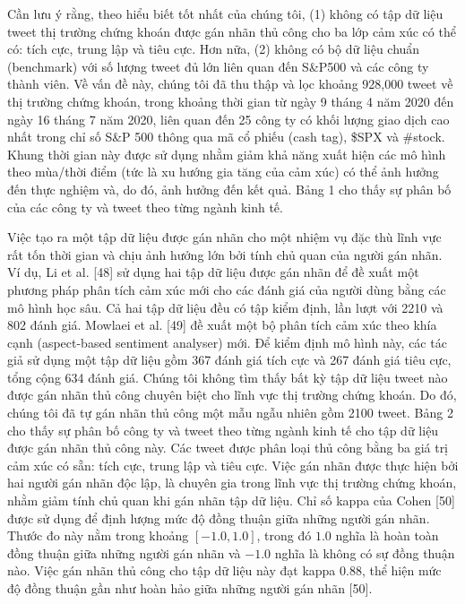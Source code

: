 Cần lưu ý rằng, theo hiểu biết tốt nhất của chúng tôi, (1) không có tập dữ liệu tweet thị trường chứng khoán được gán nhãn thủ công cho ba lớp cảm xúc có thể có: tích cực, trung lập và tiêu cực. Hơn nữa, (2) không có bộ dữ liệu chuẩn (benchmark) với số lượng tweet đủ lớn liên quan đến S\&P500 và các công ty thành viên. Về vấn đề này, chúng tôi đã thu thập và lọc khoảng 928,000 tweet về thị trường chứng khoán, trong khoảng thời gian từ ngày 9 tháng 4 năm 2020 đến ngày 16 tháng 7 năm 2020, liên quan đến 25 công ty có khối lượng giao dịch cao nhất trong chỉ số S\&P 500 thông qua mã cổ phiếu (cash tag), \$SPX và \#stock. Khung thời gian này được sử dụng nhằm giảm khả năng xuất hiện các mô hình theo mùa/thời điểm (tức là xu hướng gia tăng của cảm xúc) có thể ảnh hưởng đến thực nghiệm và, do đó, ảnh hưởng đến kết quả. Bảng 1 cho thấy sự phân bố của các công ty và tweet theo từng ngành kinh tế.

Việc tạo ra một tập dữ liệu được gán nhãn cho một nhiệm vụ đặc thù lĩnh vực rất tốn thời gian và chịu ảnh hưởng lớn bởi tính chủ quan của người gán nhãn. Ví dụ, Li et al. [48] sử dụng hai tập dữ liệu được gán nhãn để đề xuất một phương pháp phân tích cảm xúc mới cho các đánh giá của người dùng bằng các mô hình học sâu. Cả hai tập dữ liệu đều có tập kiểm định, lần lượt với 2210 và 802 đánh giá. Mowlaei et al. [49] đề xuất một bộ phân tích cảm xúc theo khía cạnh (aspect-based sentiment analyser) mới. Để kiểm định mô hình này, các tác giả sử dụng một tập dữ liệu gồm 367 đánh giá tích cực và 267 đánh giá tiêu cực, tổng cộng 634 đánh giá. Chúng tôi không tìm thấy bất kỳ tập dữ liệu tweet nào được gán nhãn thủ công chuyên biệt cho lĩnh vực thị trường chứng khoán. Do đó, chúng tôi đã tự gán nhãn thủ công một mẫu ngẫu nhiên gồm 2100 tweet. Bảng 2 cho thấy sự phân bố công ty và tweet theo từng ngành kinh tế cho tập dữ liệu được gán nhãn thủ công này. Các tweet được phân loại thủ công bằng ba giá trị cảm xúc có sẵn: tích cực, trung lập và tiêu cực. Việc gán nhãn được thực hiện bởi hai người gán nhãn độc lập, là chuyên gia trong lĩnh vực thị trường chứng khoán, nhằm giảm tính chủ quan khi gán nhãn tập dữ liệu. Chỉ số kappa của Cohen [50] được sử dụng để định lượng mức độ đồng thuận giữa những người gán nhãn. Thước đo này nằm trong khoảng $[-1.0, 1.0]$, trong đó $1.0$ nghĩa là hoàn toàn đồng thuận giữa những người gán nhãn và $-1.0$ nghĩa là không có sự đồng thuận nào. Việc gán nhãn thủ công cho tập dữ liệu này đạt kappa 0.88, thể hiện mức độ đồng thuận gần như hoàn hảo giữa những người gán nhãn [50].

